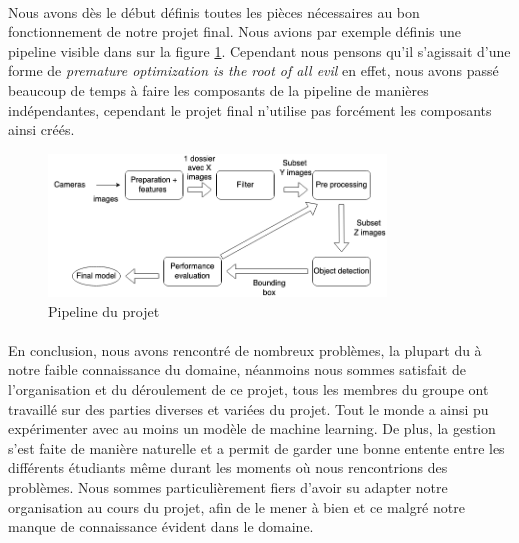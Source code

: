 \paragraph{} Nous avons dès le début définis toutes les pièces nécessaires au bon fonctionnement de notre projet final. Nous avions par exemple définis une pipeline visible dans sur la figure \ref{fig:pipeline}. Cependant nous pensons qu'il s'agissait d'une forme de \textit{premature optimization is the root of all evil} en effet, nous avons passé beaucoup de temps à faire les composants de la pipeline de manières indépendantes, cependant le projet final n'utilise pas forcément les composants ainsi créés.
\begin{figure}[H]
    \centering
    \includegraphics[width=0.8\textwidth]{images/pipeline.png}
    \caption{Pipeline du projet}    
    \label{fig:pipeline}
\end{figure}
\paragraph{} En conclusion, nous avons rencontré de nombreux problèmes, la plupart du à notre faible connaissance du domaine, néanmoins nous sommes satisfait de l'organisation et du déroulement de ce projet, tous les membres du groupe ont travaillé sur des parties diverses et variées du projet. Tout le monde a ainsi pu expérimenter avec au moins un modèle de machine learning. De plus, la gestion s'est faite de manière naturelle et a permit de garder une bonne entente entre les différents étudiants même durant les moments où nous rencontrions des problèmes. Nous sommes particulièrement fiers d'avoir su adapter notre organisation au cours du projet, afin de le mener à bien et ce malgré notre manque de connaissance évident dans le domaine.